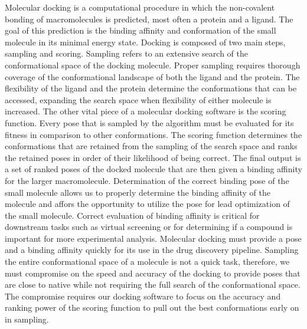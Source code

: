\documentclass[journal=jcisd8,manuscript=article]{achemso}
\begin{document}
Molecular docking is a computational procedure in which the non-covalent bonding of macromolecules is predicted, most often a protein and a ligand. The goal of this prediction is the binding affinity and conformation of the small molecule in its minimal energy state. Docking is composed of two main steps, sampling and scoring. Sampling refers to an extensive search of the conformational space of the docking molecule. Proper sampling requires thorough coverage of the conformational landscape of both the ligand and the protein. The flexibility of the ligand and the protein determine the conformations that can be accessed, expanding the search space when flexibility of either molecule is increased. The other vital piece of a molecular docking software is the scoring function. Every pose that is sampled by the algorithm must be evaluated for its fitness in comparison to other conformations. The scoring function determines the conformations that are retained from the sampling of the search space and ranks the retained poses in order of their likelihood of being correct. The final output is a set of ranked poses of the docked molecule that are then given a binding affinity for the larger macromolecule. Determination of the correct binding pose of the small molecule allows us to properly determine the binding affinity of the molecule and affors the opportunity to utilize the pose for lead optimization of the small molecule. Correct evaluation of binding affinity is critical for downstream tasks such as virtual screening or for determining if a compound is important for more experimental analysis. Molecular docking must provide a pose and a binding affinity quickly for its use in the drug discovery pipeline. Sampling the entire conformational space of a molecule is not a quick task, therefore, we must compromise on the speed and accuracy of the docking to provide poses that are close to native while not requiring the full search of the conformational space. The compromise requires our docking software to focus on the accuracy and ranking power of the scoring function to pull out the best conformations early on in sampling.
\end{document}
